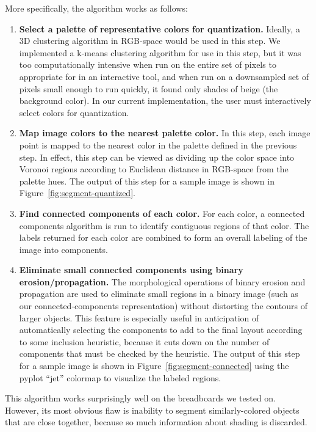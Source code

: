 \documentclass[10pt,twocolumn,letterpaper]{article}
\begin{document}
More specifically, the algorithm works as follows:
\begin{enumerate}
\item \textbf{Select a palette of representative colors for
  quantization.} Ideally, a 3D clustering algorithm in RGB-space would
  be used in this step. We implemented a k-means clustering algorithm
  for use in this step, but it was too computationally intensive when
  run on the entire set of pixels to appropriate for in an interactive
  tool, and when run on a downsampled set of pixels small enough to
  run quickly, it found only shades of beige (the background
  color). In our current implementation, the user must interactively
  select colors for quantization.
\item \textbf{Map image colors to the nearest palette color.}
  In this step, each image point is mapped to the nearest color
  in the palette defined in the previous step. In effect, this step
  can be viewed as dividing up the color space into Voronoi regions
  according to Euclidean distance in RGB-space from the palette
  hues. The output of this step for a sample image is shown in Figure~\ref{fig:segment-quantized}.
\item \textbf{Find connected components of each color.} For each
  color, a connected components algorithm is run to identify
  contiguous regions of that color. The labels returned for each color
  are combined to form an overall labeling of the image into components.
\item \textbf{Eliminate small connected components using
  binary erosion/propagation.} The morphological operations of binary
  erosion and propagation are used to eliminate small regions in
  a binary image (such as our connected-components representation)
  without distorting the contours of larger objects. This feature is
  especially useful in anticipation of automatically selecting the
  components to add to the final layout according to some inclusion
  heuristic, because it cuts down on the number of
  components that must be checked by the heuristic. The output of this
  step for a sample image is shown in
  Figure~\ref{fig:segment-connected} using the pyplot ``jet'' colormap
  to visualize the labeled regions.
\end{enumerate}

This algorithm works surprisingly well on the breadboards we tested
on. However, its most obvious flaw is inability to segment
similarly-colored objects that are close together, because so much
information about shading is discarded.
\end{document}

